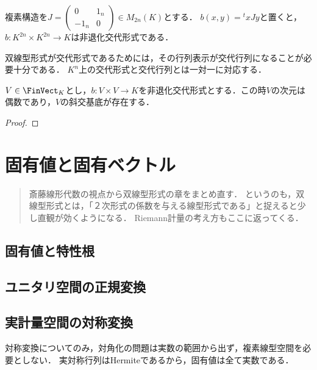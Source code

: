 \documentclass[uplatex, dvipdfmx]{jsreport}
\begin{document}
\begin{example}[複素構造の定める非退化交代形式]
    複素構造を$J=\begin{pmatrix}0&1_n\\-1_n&0\end{pmatrix}\in M_{2n}(K)$とする．
    $b(x,y)={}^t\!xJy$と置くと，$b:K^{2n}\times K^{2n}\to K$は非退化交代形式である．
\end{example}

\begin{remark}
    双線型形式が交代形式であるためには，その行列表示が交代行列になることが必要十分である．
    $K^n$上の交代形式と交代行列とは一対一に対応する．
\end{remark}

\begin{proposition}\label{prop-existence-of-symplectic-basis}
    $V\in\FinVect_K$とし，$b:V\times V\to K$を非退化交代形式とする．この時$V$の次元は偶数であり，$V$の斜交基底が存在する．
\end{proposition}
\begin{proof}
    
\end{proof}

\chapter{固有値と固有ベクトル}

\begin{quotation}
    斎藤線形代数の視点から双線型形式の章をまとめ直す．
    というのも，双線型形式とは，「２次形式の係数を与える線型形式である」と捉えると少し直観が効くようになる．
    Riemann計量の考え方もここに返ってくる．
\end{quotation}

\section{固有値と特性根}

\section{ユニタリ空間の正規変換}

\section{実計量空間の対称変換}

\begin{tcolorbox}[colframe=ForestGreen, colback=ForestGreen!10!white,breakable,colbacktitle=ForestGreen!40!white,coltitle=black,fonttitle=\bfseries\sffamily,
title=]
    対称変換についてのみ，対角化の問題は実数の範囲から出ず，複素線型空間を必要としない．
    実対称行列はHermiteであるから，固有値は全て実数である．
\end{tcolorbox}
\end{document}
